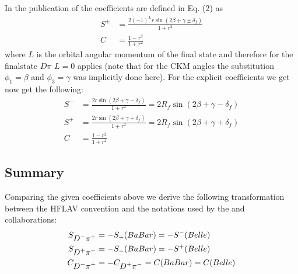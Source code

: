 \subsection{\belle}

In the publication of \belle \cite{Ronga:2006hv} the \CP coefficients are defined in Eq. (2) as
\begin{align}
S^{\pm}&=\frac{2\left(-1\right)^{L}r\sin\left(2\beta+\gamma\pm\delta_f\right)}{1+r^2}\\
C&=\frac{1-r^2}{1+r^2}
\end{align}
where $L$ is the orbital angular momentum of the final state and therefore for the finalstate $D\pi$ $L=0$ applies (note that for
the CKM angles the substitution $\phi_1=\beta$ and $\phi_3=\gamma$  was implicitly done here). For the explicit \CP coefficients
we get now get the following:
\begin{align}
S^{-}&=\frac{2r\sin\left(2\beta+\gamma-\delta_f\right)}{1+r^2} = 2R_f\sin\left(2\beta+\gamma-\delta_f\right)\\
S^{+}&=\frac{2r\sin\left(2\beta+\gamma+\delta_f\right)}{1+r^2} = 2R_f\sin\left(2\beta+\gamma+\delta_f\right)\\
C&=\frac{1-r^2}{1+r^2}
\end{align}

\subsection{Summary}

Comparing the given \CP coefficients above we derive the following transformation between the HFLAV convention and the
notations used by the \babar and \belle collaborations:
\begin{align}
S_{\mbox{\ensuremath{D^{-}\pi^{+}}}} &= -S_{+}(BaBar) = -S^{-}(Belle)\\
S_{\mbox{\ensuremath{D^{+}\pi^{-}}}} &= -S_{-}(BaBar) = -S^{+}(Belle)\\
C_{\mbox{\ensuremath{D^{-}\pi^{+}}}} &= -C_{\mbox{\ensuremath{D^{+}\pi^{-}}}} = C(BaBar) = C(Belle)
\end{align}
